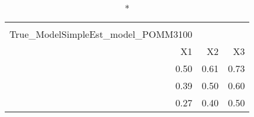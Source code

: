 \begin{longtable}{rrr}
\caption*{
{\large Pestmatrix} \\ 
{\small True\_ModelSimpleEst\_model\_POMM3100}
} \\ 
\toprule
X1 & X2 & X3 \\ 
\midrule
0.50 & 0.61 & 0.73 \\ 
0.39 & 0.50 & 0.60 \\ 
0.27 & 0.40 & 0.50 \\ 
\bottomrule
\end{longtable}

